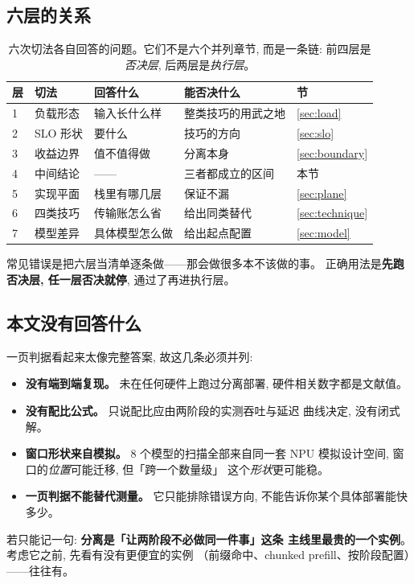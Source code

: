 \subsection{六层的关系}

\begin{table}[t]
\centering
\caption{六次切法各自回答的问题。它们不是六个并列章节, 而是一条链:
前四层是\emph{否决层}, 后两层是\emph{执行层}。}
\label{tab:layers}
\small
\setlength{\tabcolsep}{7pt}
\begin{tabular}{@{}p{0.75cm}p{2.99cm}p{5.08cm}p{4.33cm}p{1.79cm}@{}}
\toprule
层 & 切法 & 回答什么 & 能否决什么 & 节 \\
\midrule
1 & 负载形态 & 输入长什么样 & 整类技巧的用武之地 & \ref{sec:load} \\
2 & SLO 形状 & 要什么 & 技巧的方向 & \ref{sec:slo} \\
3 & 收益边界 & 值不值得做 & 分离本身 & \ref{sec:boundary} \\
4 & 中间结论 & —— & 三者都成立的区间 & 本节 \\
5 & 实现平面 & 栈里有哪几层 & 保证不漏 & \ref{sec:plane} \\
6 & 四类技巧 & 传输账怎么省 & 给出同类替代 & \ref{sec:technique} \\
7 & 模型差异 & 具体模型怎么做 & 给出起点配置 & \ref{sec:model} \\
\bottomrule
\end{tabular}
\end{table}

\noindent 常见错误是把六层当清单逐条做——那会做很多本不该做的事。
正确用法是\textbf{先跑否决层, 任一层否决就停}, 通过了再进执行层。

\subsection{本文没有回答什么}

一页判据看起来太像完整答案, 故这几条必须并列:

\begin{itemize}[leftmargin=1.3em,itemsep=1pt,topsep=2pt]
  \item \textbf{没有端到端复现。} 未在任何硬件上跑过分离部署,
        硬件相关数字都是文献值。
  \item \textbf{没有配比公式。} 只说配比应由两阶段的实测吞吐与延迟
        曲线决定, 没有闭式解。
  \item \textbf{窗口形状来自模拟。} 8 个模型的扫描全部来自同一套 NPU
        模拟设计空间, 窗口的\emph{位置}可能迁移, 但「跨一个数量级」
        这个\emph{形状}更可能稳。
  \item \textbf{一页判据不能替代测量。} 它只能排除错误方向,
        不能告诉你某个具体部署能快多少。
\end{itemize}

\noindent 若只能记一句: \textbf{分离是「让两阶段不必做同一件事」这条
主线里最贵的一个实例}。考虑它之前, 先看有没有更便宜的实例
（前缀命中、chunked prefill、按阶段配置）——往往有。
